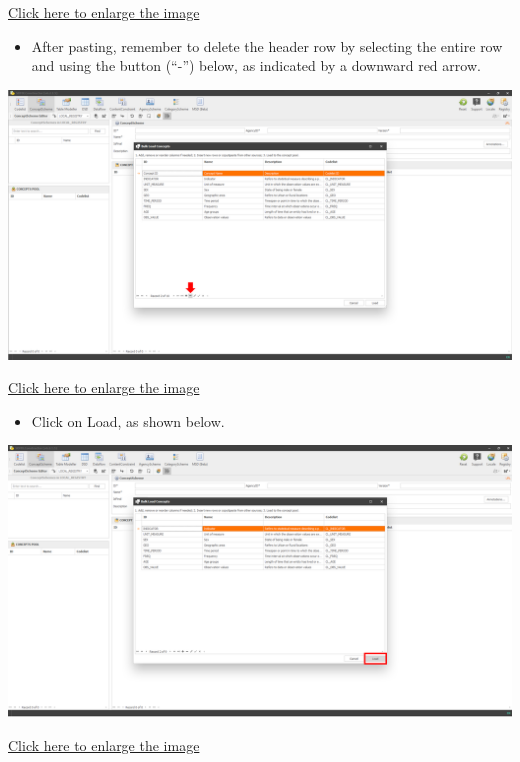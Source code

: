 \documentclass[
]{book}
\providecommand{\tightlist}{%
  \setlength{\itemsep}{0pt}\setlength{\parskip}{0pt}}
\theoremstyle{definition}
\theoremstyle{definition}
\theoremstyle{definition}
\theoremstyle{definition}
\theoremstyle{remark}
\begin{document}
\href{images/image106.png}{Click here to enlarge the image}

\begin{itemize}
\tightlist
\item
  After pasting, remember to delete the header row by selecting the entire row and using the button (``-'') below, as indicated by a downward red arrow.
\end{itemize}

\begin{center}\includegraphics[width=1\linewidth]{./images/image108} \end{center}

\href{images/image108.png}{Click here to enlarge the image}

\begin{itemize}
\tightlist
\item
  Click on Load, as shown below.
\end{itemize}

\begin{center}\includegraphics[width=1\linewidth]{./images/image110} \end{center}

\href{images/image110.png}{Click here to enlarge the image}
\end{document}
